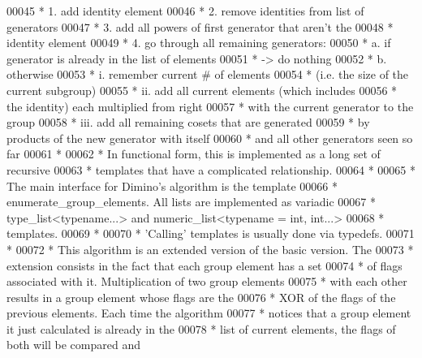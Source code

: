 \begin{DoxyCode}
00045 \textcolor{comment}{ * 1. add identity element}
00046 \textcolor{comment}{ * 2. remove identities from list of generators}
00047 \textcolor{comment}{ * 3. add all powers of first generator that aren't the}
00048 \textcolor{comment}{ *    identity element}
00049 \textcolor{comment}{ * 4. go through all remaining generators:}
00050 \textcolor{comment}{ *        a. if generator is already in the list of elements}
00051 \textcolor{comment}{ *                -> do nothing}
00052 \textcolor{comment}{ *        b. otherwise}
00053 \textcolor{comment}{ *                i.   remember current # of elements}
00054 \textcolor{comment}{ *                     (i.e. the size of the current subgroup)}
00055 \textcolor{comment}{ *                ii.  add all current elements (which includes}
00056 \textcolor{comment}{ *                     the identity) each multiplied from right}
00057 \textcolor{comment}{ *                     with the current generator to the group}
00058 \textcolor{comment}{ *                iii. add all remaining cosets that are generated}
00059 \textcolor{comment}{ *                     by products of the new generator with itself}
00060 \textcolor{comment}{ *                     and all other generators seen so far}
00061 \textcolor{comment}{ *}
00062 \textcolor{comment}{ * In functional form, this is implemented as a long set of recursive}
00063 \textcolor{comment}{ * templates that have a complicated relationship.}
00064 \textcolor{comment}{ *}
00065 \textcolor{comment}{ * The main interface for Dimino's algorithm is the template}
00066 \textcolor{comment}{ * enumerate\_group\_elements. All lists are implemented as variadic}
00067 \textcolor{comment}{ * type\_list<typename...> and numeric\_list<typename = int, int...>}
00068 \textcolor{comment}{ * templates.}
00069 \textcolor{comment}{ *}
00070 \textcolor{comment}{ * 'Calling' templates is usually done via typedefs.}
00071 \textcolor{comment}{ *}
00072 \textcolor{comment}{ * This algorithm is an extended version of the basic version. The}
00073 \textcolor{comment}{ * extension consists in the fact that each group element has a set}
00074 \textcolor{comment}{ * of flags associated with it. Multiplication of two group elements}
00075 \textcolor{comment}{ * with each other results in a group element whose flags are the}
00076 \textcolor{comment}{ * XOR of the flags of the previous elements. Each time the algorithm}
00077 \textcolor{comment}{ * notices that a group element it just calculated is already in the}
00078 \textcolor{comment}{ * list of current elements, the flags of both will be compared and}

\end{DoxyCode}
